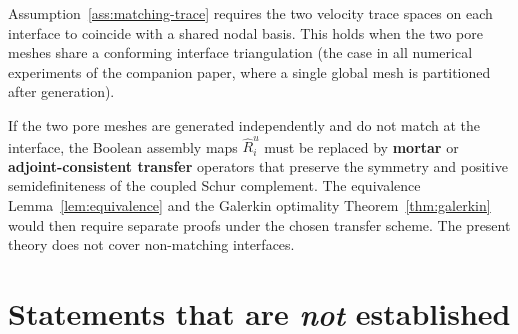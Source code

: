 \documentclass[11pt,a4paper]{article}
\begin{document}
Assumption~\ref{ass:matching-trace} requires the two velocity trace
spaces on each interface to coincide with a shared nodal basis.
This holds when the two pore meshes share a conforming interface
triangulation (the case in all numerical experiments of the companion
paper, where a single global mesh is partitioned after generation).

If the two pore meshes are generated independently and do not match
at the interface, the Boolean assembly maps $\widehat{R}_i^u$ must be
replaced by \textbf{mortar} or \textbf{adjoint-consistent transfer}
operators that preserve the symmetry and positive semidefiniteness of
the coupled Schur complement.  The equivalence
Lemma~\ref{lem:equivalence} and the Galerkin optimality
Theorem~\ref{thm:galerkin} would then require separate proofs under
the chosen transfer scheme.  The present theory does not cover
non-matching interfaces.

\section{Statements that are \emph{not} established}
\end{document}
